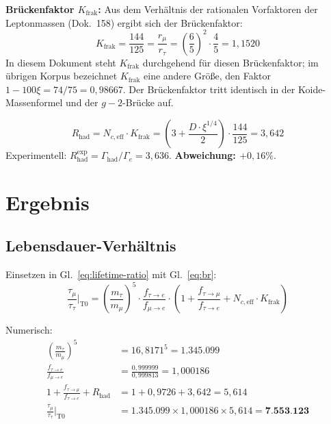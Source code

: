 	\textbf{Brückenfaktor $K_\text{frak}$:} Aus dem Verhältnis der rationalen Vorfaktoren der Leptonmassen (Dok.~158) ergibt sich der Brückenfaktor:
	\begin{equation}
		K_\text{frak} = \frac{144}{125} = \frac{r_\mu}{r_\tau} = \left(\frac{6}{5}\right)^2 \cdot \frac{4}{5} = 1{,}1520
	\end{equation}
	In diesem Dokument steht $K_\text{frak}$ durchgehend für diesen Brückenfaktor; im übrigen Korpus bezeichnet $K_\text{frak}$ eine andere Größe, den Faktor $1 - 100\xi = 74/75 = 0{,}98667$. Der Brückenfaktor tritt identisch in der Koide-Massenformel und der $g-2$-Brücke auf.
	
	\begin{keypoint}
		\begin{equation}
			R_\text{had} = N_{c,\text{eff}} \cdot K_\text{frak} = \left(3 + \frac{D \cdot \xi^{1/4}}{2}\right) \cdot \frac{144}{125} = 3{,}642
			\label{eq:rhad}
		\end{equation}
		Experimentell: $R_\text{had}^\text{exp} = \Gamma_\text{had}/\Gamma_e = 3{,}636$. \textbf{Abweichung: $+0{,}16\%$}.
	\end{keypoint}
	
	
	\section{Ergebnis}
	
	\subsection{Lebensdauer-Verhältnis}
	
	Einsetzen in Gl.~\eqref{eq:lifetime-ratio} mit Gl.~\eqref{eq:br}:
	\begin{equation}
		\frac{\tau_\mu}{\tau_\tau}\bigg|_\text{T0} = \left(\frac{m_\tau}{m_\mu}\right)^5 \cdot \frac{f_{\tau \to e}}{f_{\mu \to e}} \cdot \left(1 + \frac{f_{\tau \to \mu}}{f_{\tau \to e}} + N_{c,\text{eff}} \cdot K_\text{frak}\right)
	\end{equation}
	
	Numerisch:
	\begin{align}
		\left(\frac{m_\tau}{m_\mu}\right)^5 &= 16{,}8171^5 = 1{.}345{.}099 \\
		\frac{f_{\tau \to e}}{f_{\mu \to e}} &= \frac{0{,}999999}{0{,}999813} = 1{,}000186 \\
		1 + \frac{f_{\tau \to \mu}}{f_{\tau \to e}} + R_\text{had} &= 1 + 0{,}9726 + 3{,}642 = 5{,}614 \\[6pt]
		\frac{\tau_\mu}{\tau_\tau}\bigg|_\text{T0} &= 1{.}345{.}099 \times 1{,}000186 \times 5{,}614 = \mathbf{7{.}553{.}123}
	\end{align}
	
